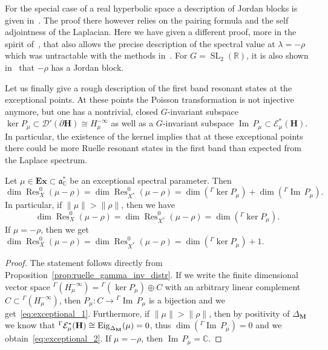 \documentclass[AHL, Unicode, longabstracts, published]{cedram}
\DeclareMathOperator{\SL}{SL}
\DeclareMathOperator{\Res}{Res}
\DeclareMathOperator{\Eig}{Eig}
\DeclareMathOperator{\Imag}{Im}
\newcommand{\rr}{\mathbb{R}}
\newcommand{\cc}{\mathbb{C}}
\newcommand{\bfh}{\mathbf{H}}
\newcommand{\bfm}{\mathbf{M}}
\newcommand{\pl}{\partial}
\renewcommand{\a}{\mathfrak a}
\begin{document}
For the special case of a real hyperbolic space a description of Jordan blocks is given in~\cite{DFG15}. The proof there however relies on the pairing formula and the self adjointness of the Laplacian. Here we have given a different proof, more in the spirit of~\cite{GHW18}, that also allows the precise description of the spectral value at $\lambda=-\rho$ which was untractable with the methods in~\cite{DFG15}. For $G={\SL}_2(\rr)$, it is also shown in~\cite{Co05,FF03} that $-\rho$ has a Jordan block.


Let us finally give a rough description of the first band resonant states at the exceptional points. At these points the Poisson transformation is not injective anymore, but one has a nontrivial, closed $G$-invariant subspace $\ker P_\mu \subset \mathcal D'(\pl {\bfh})\cong H_\mu^{-\infty}$ as well as a $G$-invariant subspace ${\Imag}\, P_\mu \subset \mathcal E_\mu^*({\bfh})$. In particular, the existence of the kernel implies that at these exceptional points there could be more Ruelle resonant states in the first band than expected from the Laplace spectrum.

\begin{prop}
Let $\mu\in \mathbf{Ex}\subset \a^*_\cc$ be an exceptional spectral parameter. Then
\begin{equation}\label{eq:exceptional_1}
\dim \Res^0_{X}(\mu-\rho) = \dim \Res^0_{X^*}(\mu-\rho) = \dim (^\Gamma\ker P_\mu) + \dim (^\Gamma{\Imag}\,P_\mu).
\end{equation}
In particular, if $\|\mu\| > \|\rho\|$, then we have
\begin{equation}\label{eq:exceptional_2}
\dim \Res^0_{X}(\mu-\rho) = \dim \Res^0_{X^*}(\mu-\rho) = \dim (^\Gamma\ker P_\mu).
\end{equation}
If $\mu=-\rho$, then we get $ \dim \Res^0_{X}(\mu-\rho) = \dim \Res^0_{X^*}(\mu-\rho) = \dim (^\Gamma\ker P_\mu)+1$.
\end{prop}

\begin{proof}
The statement follows directly from Proposition~\ref{prop:ruelle_gamma_inv_distr}. If we write the finite dimensional vector space $^\Gamma(H^{-\infty}_{\mu}) = {^\Gamma(\ker P_\mu)}\oplus C$ with an arbitrary linear complement $C\subset{} ^\Gamma(H^{-\infty}_{\mu})$, then $P_\mu: C\to{^\Gamma {\Imag}\,P_\mu}$ is a bijection and we get~\eqref{eq:exceptional_1}. Furthermore, if $\|\mu\| > \|\rho\|$, then by positivity of $\Delta_{\bfm}$ we know that $^\Gamma \mathcal E^*_\mu({\bfh})\linebreak\cong \Eig_{\Delta_{\bfm}}(\mu) = 0$, thus $\dim (^\Gamma {\Imag}\,P_\mu)=0$ and we obtain~\eqref{eq:exceptional_2}. If $\mu=-\rho$, then ${\Imag}\,P_\mu=\cc$.
\end{proof}
\end{document}
